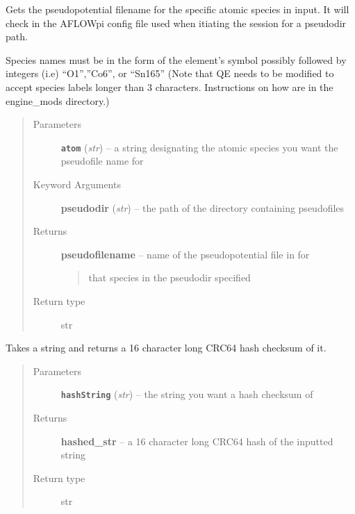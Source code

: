\documentclass[letterpaper,10pt,english]{sphinxmanual}
\begin{document}

\begin{fulllineitems}
\label{prep:prep.__getPseudofilename}
Gets the pseudopotential filename for the specific atomic species in input.
It will check in the AFLOWpi config file used when itiating the session for
a pseudodir path.

Species names must be in the form of the element's symbol possibly followed by integers
(i.e) ``O1'',''Co6'', or ``Sn165'' (Note that QE needs to be modified to accept species labels
longer than 3 characters. Instructions on how are in the engine\_mods directory.)
\begin{quote}\begin{description}
\item[{Parameters}] \leavevmode
\textbf{\texttt{atom}} (\emph{str}) -- a string designating the atomic species you want the pseudofile name for

\item[{Keyword Arguments}] \leavevmode
\textbf{pseudodir} (\emph{str}) --
the path of the directory containing pseudofiles

\item[{Returns}] \leavevmode

\textbf{pseudofilename} --
name of the pseudopotential file in for
\begin{quote}

that species in the pseudodir specified
\end{quote}


\item[{Return type}] \leavevmode
str

\end{description}\end{quote}

\end{fulllineitems}


\begin{fulllineitems}
\label{prep:prep.__hash64String}
Takes a string and returns a 16 character long CRC64 hash checksum of it.
\begin{quote}\begin{description}
\item[{Parameters}] \leavevmode
\textbf{\texttt{hashString}} (\emph{str}) -- the string you want a hash checksum of

\item[{Returns}] \leavevmode
\textbf{hashed\_str} --
a 16 character long CRC64 hash of the inputted string

\item[{Return type}] \leavevmode
str

\end{description}\end{quote}

\end{fulllineitems}
\end{document}
